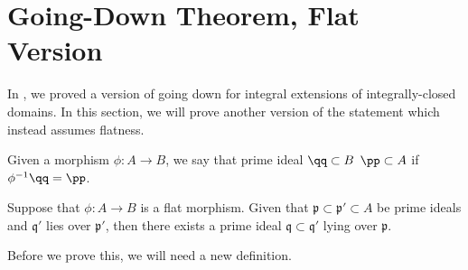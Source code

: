 \section{Going-Down Theorem, Flat Version}
\label{sec:going_down}
In , we proved a version of going down for integral extensions of integrally-closed domains. In this section, we will prove another version of the statement which instead assumes flatness.
\begin{theorem}
    \label{thm:going_down_flat}
    Given a morphism $\phi : A\to B$, 
    we say that prime ideal $\qq\subset B$
     $\pp\subset A$
    if $\phi^{-1}\qq = \pp$.
    
    Suppose that $\phi  :A\to B$ is a flat morphism.
    Given that $\mathfrak p\subset\mathfrak p'\subset A$
    be prime ideals and $\mathfrak q'$ lies over $\mathfrak p'$,
    then there exists a prime ideal $\mathfrak q\subset\mathfrak q'$
    lying over $\mathfrak p$.
    \begin{center}
    \end{center}
\end{theorem}
Before we prove this, we will need a new definition.
